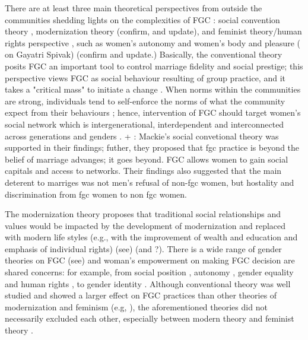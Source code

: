 \documentclass[12pt,]{article}
\begin{document}
There are at least three main theoretical perspectives from outside the communities
shedding lights on the complexities of FGC \cite{Hayf05, Youn02}:  social convention theory \cite{Mack96, Mack00, Mack06, MackLeJe09, DuncWand11}, modernization theory\cite{BoylMcMo02, Youn02} (confirm, and update), and feminist theory/human rights perspective \cite{Dell04, FrieMahm13,KhosBane17, Lewi95, Lewi09, Meye00, Morr08, Njam04, UNIC16, YirgKass12, Youn02}, such as women's autonomy \cite{Meye00} and women's body and pleasure (\cite{Morr08} on Gayatri Spivak) (confirm and update.)  Basically, the conventional theory posits FGC an important tool to control marriage fidelity and social prestige; this perspective views FGC as social behaviour resulting of group practice, and it takes a "critical mass" to initiate a change \cite{Mack00, MackLeJe09}.  When norms within the communities are strong, individuals tend to self-enforce the norms of what the community expect from their behaviours \cite{Ajze02, Hayf05, KandNwak09, Mack96, Mack06, MackLeJe09, ThomMadd92}; hence, intervention of FGC should target women's social network which is intergenerational, interdependent and interconnected across generations and genders \cite{Mack00, DuncWand11}.
+ \cite{Shel-Wand11}:  Mackie's social convetional theory was supported in their findings; futher, they proposed that fgc practice is beyond the belief of marriage advanges; it goes beyond.  FGC allows women to gain social capitals and access to networks.  Their findings also suggested that the main deterent to marriges was not men's refusal of non-fgc women, but hostality and discrimination from fgc women to non fgc women.

The modernization theory proposes that traditional social relationships and values would be impacted by the development of modernization and replaced with modern life styles (e.g., with the improvement of wealth and education and emphasis of individual rights) (see\cite{Moor13}) (and \cite{BoylMcMo02, Youn02}?).  There is a wide range of gender theories on FGC (see\cite{Anti13, Hodg11, Lewi95}) and woman’s empowerment on making FGC decision are shared concerns:  for example, from social position \cite{VanMeek15}, autonomy \cite{Meye00}, gender equality and human rights \cite{Drol11}, to gender identity \cite{Youn04, Koom14, WintKoom09}.  Although conventional theory was well studied and showed a larger effect on FGC practices than other theories of modernization and feminism (e.g, \cite{BoylMcMo02, BoylCorl10, FreyJohn07, FrieMahm13, Hayf05, KandMwek09, Mack96, Mack06, ReigGonz14, YirgKass12}), the aforementioned theories did not necessarily excluded each other, especially between modern theory and feminist theory \cite{Hayf05}.
\end{document}

